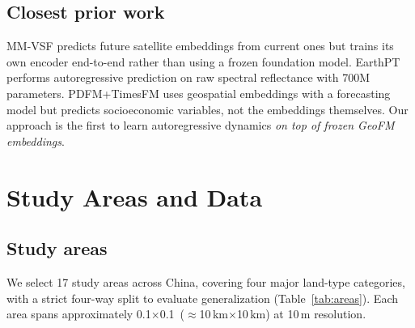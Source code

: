 \documentclass{article}
\begin{document}
\subsection{Closest prior work}

MM-VSF \citep{mmvsf2024} predicts future satellite embeddings from current ones but trains its own encoder end-to-end rather than using a frozen foundation model. EarthPT \citep{smith2023earthpt} performs autoregressive prediction on raw spectral reflectance with 700M parameters. PDFM+TimesFM \citep{google2024pdfm} uses geospatial embeddings with a forecasting model but predicts socioeconomic variables, not the embeddings themselves. Our approach is the first to learn autoregressive dynamics \textit{on top of frozen GeoFM embeddings}.


\section{Study Areas and Data}
\label{sec:data}

\subsection{Study areas}

We select 17 study areas across China, covering four major land-type categories, with a strict four-way split to evaluate generalization (Table~\ref{tab:areas}). Each area spans approximately 0.1\textdegree$\times$0.1\textdegree\ ($\approx$10\,km$\times$10\,km) at 10\,m resolution.
\end{document}
